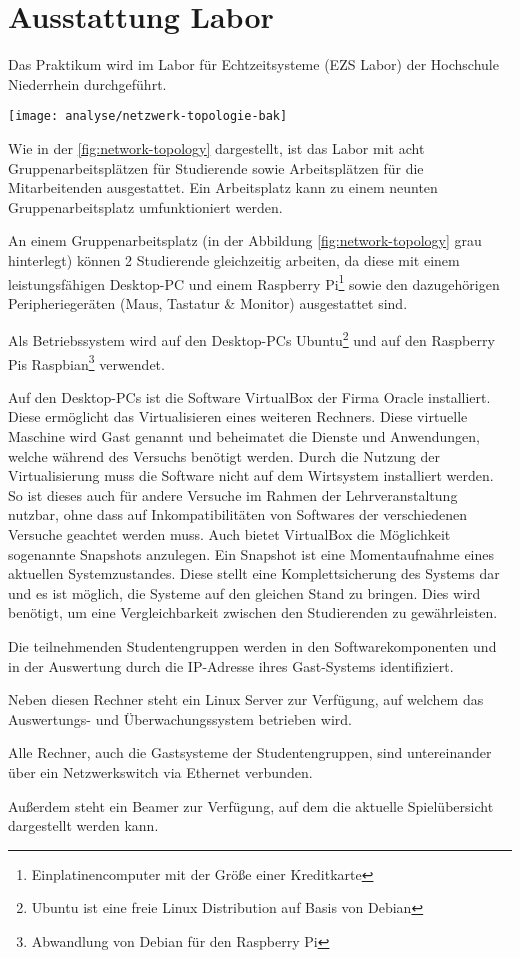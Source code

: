 \section{Ausstattung Labor}
\label{sec:Ausstattung_Labor}

Das Praktikum wird im Labor für Echtzeitsysteme (EZS Labor) der Hochschule Niederrhein durchgeführt.

\begin{center}
	\texttt{[image: analyse/netzwerk-topologie-bak]}
	\label{fig:network-topology}
\end{center}

Wie in der \autoref{fig:network-topology} dargestellt, ist das Labor mit acht Gruppenarbeitsplätzen für Studierende sowie Arbeitsplätzen für die Mitarbeitenden ausgestattet. Ein Arbeitsplatz kann zu einem neunten Gruppenarbeitsplatz umfunktioniert werden.

An einem Gruppenarbeitsplatz (in der Abbildung \ref{fig:network-topology} grau hinterlegt) können 2 Studierende gleichzeitig arbeiten, da diese mit einem leistungsfähigen Desktop-PC und einem Raspberry Pi\footnote{Einplatinencomputer mit der Größe einer Kreditkarte} sowie den dazugehörigen Peripheriegeräten (Maus, Tastatur \& Monitor) ausgestattet sind.

Als Betriebssystem wird auf den Desktop-PCs Ubuntu\footnote{Ubuntu ist eine freie Linux Distribution auf Basis von Debian} und auf den Raspberry Pis Raspbian\footnote{Abwandlung von Debian für den Raspberry Pi} verwendet.

Auf den Desktop-PCs ist die Software VirtualBox der Firma Oracle installiert. Diese ermöglicht das Virtualisieren eines weiteren Rechners. Diese virtuelle Maschine wird Gast genannt und beheimatet die Dienste und Anwendungen, welche während des Versuchs benötigt werden. Durch die Nutzung der Virtualisierung muss die Software nicht auf dem Wirtsystem installiert werden. So ist dieses auch für andere Versuche im Rahmen der Lehrveranstaltung nutzbar, ohne dass auf Inkompatibilitäten von Softwares der verschiedenen Versuche geachtet werden muss. Auch bietet VirtualBox die Möglichkeit sogenannte Snapshots anzulegen. Ein Snapshot ist eine Momentaufnahme eines aktuellen Systemzustandes. Diese stellt eine Komplettsicherung des Systems dar und es ist möglich, die Systeme auf den gleichen Stand zu bringen. \cite{oraclecorporationOracleVMVirtualBox2020} Dies wird benötigt, um eine Vergleichbarkeit zwischen den Studierenden zu gewährleisten.

Die teilnehmenden Studentengruppen werden in den Softwarekomponenten und in der Auswertung durch die IP-Adresse ihres Gast-Systems identifiziert.

Neben diesen Rechner steht ein Linux Server zur Verfügung, auf welchem das Auswertungs- und Überwachungssystem betrieben wird.

Alle Rechner, auch die Gastsysteme der Studentengruppen, sind untereinander über ein Netzwerkswitch via Ethernet verbunden.

Außerdem steht ein Beamer zur Verfügung, auf dem die aktuelle Spielübersicht dargestellt werden kann.